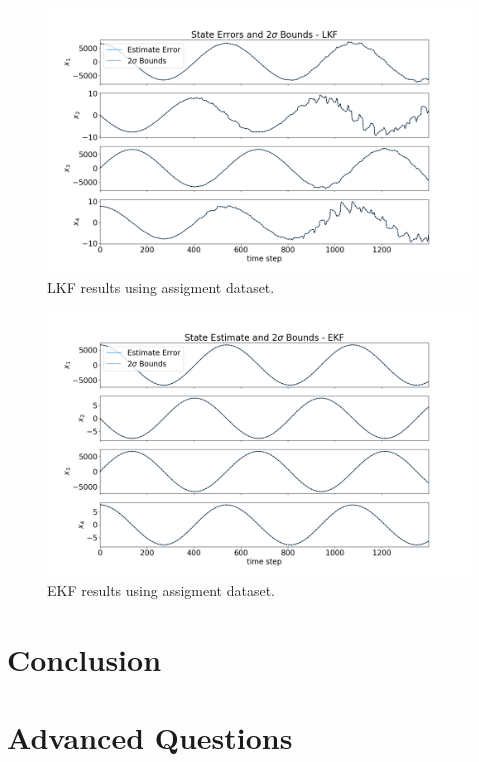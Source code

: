 \documentclass[11pt, a4paper]{article}
\begin{document}
\begin{figure}[H]
	\centering
	\includegraphics[width=\textwidth]{Figures/lkf_dataste_est.png}
	\caption{LKF results using assigment dataset.}
	\label{fig:lkf_dataset}
\end{figure}

\begin{figure}[H]
	\centering
	\includegraphics[width=\textwidth]{Figures/ekf_dataset_est.png}
	\caption{EKF results using assigment dataset.}
	\label{fig:ekf_dataset}
\end{figure}


\section{Conclusion}

\section{Advanced Questions}
\end{document}

